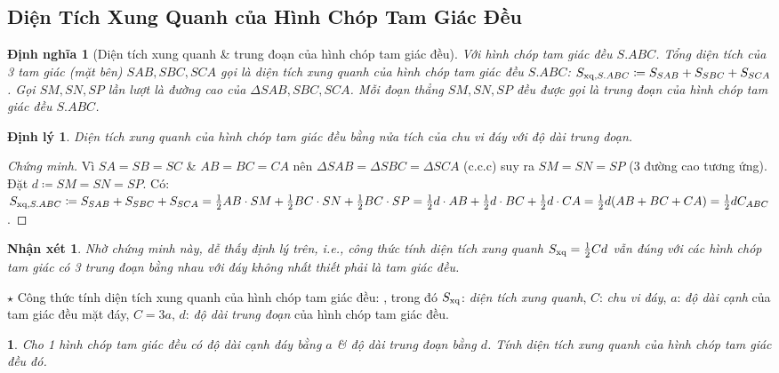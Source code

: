 \documentclass{article}
\newtheorem{baitoan}{}
\newtheorem{dinhly}{Định lý}
\newtheorem{dinhnghia}{Định nghĩa}
\newtheorem{nhanxet}{Nhận xét}
\begin{document}
\subsection{Diện Tích Xung Quanh của Hình Chóp Tam Giác Đều}

\begin{dinhnghia}[Diện tích xung quanh \& trung đoạn của hình chóp tam giác đều]
	Với hình chóp tam giác đều $S.ABC$. Tổng diện tích của 3 tam giác (mặt bên) $SAB,SBC,SCA$ gọi là {\rm diện tích xung quanh} của hình chóp tam giác đều $S.ABC$: $S_{{\rm xq},S.ABC}\coloneqq S_{SAB} + S_{SBC} + S_{SCA}$. Gọi $SM,SN,SP$ lần lượt là đường cao của $\Delta SAB,SBC,SCA$. Mỗi đoạn thẳng $SM,SN,SP$ đều được gọi là {\rm trung đoạn} của hình chóp tam giác đều $S.ABC$.
\end{dinhnghia}

\begin{dinhly}
	Diện tích xung quanh của hình chóp tam giác đều bằng nửa tích của chu vi đáy với độ dài trung đoạn.
\end{dinhly}

\begin{proof}[Chứng minh]
	Vì $SA = SB = SC$ \& $AB = BC = CA$ nên $\Delta SAB = \Delta SBC = \Delta SCA$ (c.c.c) suy ra $SM = SN = SP$ (3 đường cao tương ứng). Đặt $d\coloneqq SM = SN = SP$. Có: $S_{{\rm xq},S.ABC}\coloneqq S_{SAB} + S_{SBC} + S_{SCA} = \frac{1}{2}AB\cdot SM + \frac{1}{2}BC\cdot SN + \frac{1}{2}BC\cdot SP = \frac{1}{2}d\cdot AB + \frac{1}{2}d\cdot BC + \frac{1}{2}d\cdot CA = \frac{1}{2}d(AB + BC + CA) = \frac{1}{2}dC_{ABC}$.
\end{proof}

\begin{nhanxet}
	Nhờ chứng minh này, dễ thấy định lý trên, i.e., công thức tính diện tích xung quanh $S_{\rm xq} = \frac{1}{2}Cd$ vẫn đúng với các hình chóp tam giác có 3 trung đoạn bằng nhau với đáy không nhất thiết phải là tam giác đều.
\end{nhanxet}
\noindent$\star$ {\sf Công thức tính diện tích xung quanh của hình chóp tam giác đều:} , trong đó $S_{\rm xq}$: \textit{diện tích xung quanh}, $C$: \textit{chu vi đáy}, $a$: \textit{độ dài cạnh} của tam giác đều mặt đáy, $C = 3a$, $d$: \textit{độ dài trung đoạn} của hình chóp tam giác đều.

\begin{baitoan}
	Cho 1 hình chóp tam giác đều có độ dài cạnh đáy bằng $a$ \& độ dài trung đoạn bằng $d$. Tính diện tích xung quanh của hình chóp tam giác đều đó.
\end{baitoan}
\end{document}

